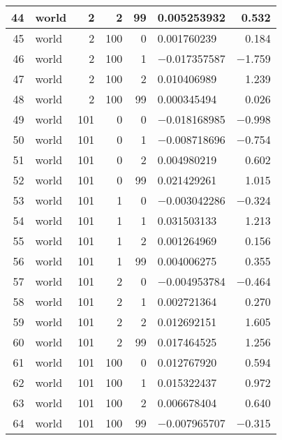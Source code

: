 \begin{longtable}{|r|l|r|r|r|l|r|}
   44 &    world &    2 &    2 &    99 &    0.005253932 &    0.532\\\hline
   45 &    world &    2 &    100 &    0 &    0.001760239 &    0.184\\\hline
   46 &    world &    2 &    100 &    1 &    $-$0.017357587 &    $-$1.759\\\hline
   47 &    world &    2 &    100 &    2 &    0.010406989 &    1.239\\\hline
   48 &    world &    2 &    100 &    99 &    0.000345494 &    0.026\\\hline
   49 &    world &    101 &    0 &    0 &    $-$0.018168985 &    $-$0.998\\\hline
   50 &    world &    101 &    0 &    1 &    $-$0.008718696 &    $-$0.754\\\hline
   51 &    world &    101 &    0 &    2 &    0.004980219 &    0.602\\\hline
   52 &    world &    101 &    0 &    99 &    0.021429261 &    1.015\\\hline
   53 &    world &    101 &    1 &    0 &    $-$0.003042286 &    $-$0.324\\\hline
   54 &    world &    101 &    1 &    1 &    0.031503133 &    1.213\\\hline
   55 &    world &    101 &    1 &    2 &    0.001264969 &    0.156\\\hline
   56 &    world &    101 &    1 &    99 &    0.004006275 &    0.355\\\hline
   57 &    world &    101 &    2 &    0 &    $-$0.004953784 &    $-$0.464\\\hline
   58 &    world &    101 &    2 &    1 &    0.002721364 &    0.270\\\hline
   59 &    world &    101 &    2 &    2 &    0.012692151 &    1.605\\\hline
   60 &    world &    101 &    2 &    99 &    0.017464525 &    1.256\\\hline
   61 &    world &    101 &    100 &    0 &    0.012767920 &    0.594\\\hline
   62 &    world &    101 &    100 &    1 &    0.015322437 &    0.972\\\hline
   63 &    world &    101 &    100 &    2 &    0.006678404 &    0.640\\\hline
   64 &    world &    101 &    100 &    99 &    $-$0.007965707 &    $-$0.315\\\hline
\end{longtable}

